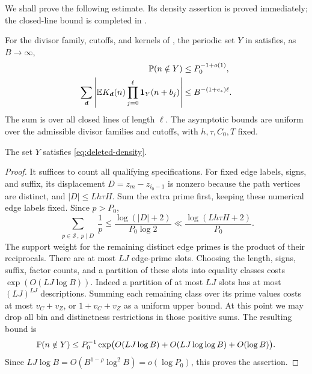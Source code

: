 We shall prove the following estimate.  Its density assertion is
proved immediately; the closed-line bound is completed in
.

\begin{theorem}\label{thm:high-trace}
For the divisor family, cutoffs, and kernels of
, the periodic set $Y$ in
 satisfies, as $B\to\infty$,
\begin{align}
 \mathbb P(n\notin Y)&\le P_0^{-1+o(1)},\label{eq:deleted-density}\\
 \sum_{\boldsymbol d}
 \left|\mathbb E K_{\boldsymbol d}(n)
       \prod_{j=0}^{\ell}\mathbf 1_Y(n+b_j)\right|
   &\le B^{-(1+c_*)\ell}.\label{eq:high-trace}
\end{align}
The sum is over all closed lines of length $\ell$.  The asymptotic
bounds are uniform over the admissible divisor families and cutoffs,
with $h,\tau,C_0,T$ fixed.
\end{theorem}

\begin{lemma}\label{lem:bad-density}
The set $Y$ satisfies \eqref{eq:deleted-density}.
\end{lemma}

\begin{proof}
It suffices to count all qualifying specifications.  For fixed edge
labels, signs, and suffix, its displacement $D=z_m-z_{i_0-1}$ is
nonzero because the path vertices are distinct, and
$|D|\le Lh\tau H$.  Sum the extra prime first, keeping these numerical
edge labels fixed.  Since $p>P_0$,
\[
 \sum_{\substack{p\in\mathcal S\,,\ p\mid D}}
       \frac1p
 \le \frac{\log(|D|+2)}{P_0\log 2}
 \ll \frac{\log(Lh\tau H+2)}{P_0}.
\]
The support weight for the remaining distinct edge primes is the
product of their reciprocals.  There are at most $LJ$ edge-prime
slots.  Choosing the length, signs, suffix, factor counts, and a
partition of these slots into equality classes costs
$\exp(O(LJ\log B))$.  Indeed a partition of at most $LJ$ slots has
at most $(LJ)^{LJ}$ descriptions.  Summing each remaining class over
its prime values costs at most $v_C+v_Z$, or $1+v_C+v_Z$ as a uniform
upper bound.  At this point we may drop all bin and distinctness
restrictions in those positive sums.  The resulting bound is
\[
 \mathbb P(n\notin Y)
 \le P_0^{-1}
    \exp\bigl(O(LJ\log B)+O(LJ\log\log B)+O(\log B)\bigr).
\]
Since $LJ\log B=O(B^{1-\rho}\log^2B)=o(\log P_0)$, this proves
the assertion.
\end{proof}

